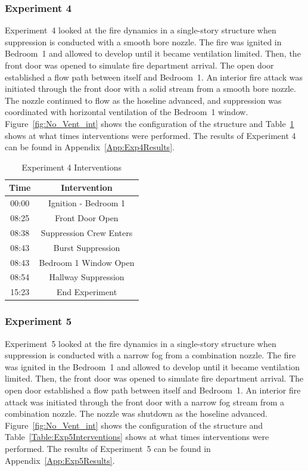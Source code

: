 \documentclass[12pt,oneside]{book}
\begin{document}
\FloatBarrier

\subsubsection{Experiment 4}
Experiment~4 looked at the fire dynamics in a single-story structure when suppression is conducted with a smooth bore nozzle. The fire was ignited in Bedroom~1 and allowed to develop until it became ventilation limited. Then, the front door was opened to simulate fire department arrival. The open door established a flow path between itself and Bedroom~1. An interior fire attack was initiated through the front door with a solid stream from a smooth bore nozzle. The nozzle continued to flow as the hoseline advanced, and suppression was coordinated with horizontal ventilation of the Bedroom~1 window. Figure~\ref{fig:No_Vent_int} shows the configuration of the structure and Table~\ref{Table:Exp4Interventions} shows at what times interventions were performed. The results of Experiment 4 can be found in Appendix~\ref{App:Exp4Results}. 


\begin{table}[!ht]
	\centering
	\caption{Experiment 4 Interventions}
	\begin{tabular}{|c|c|} 
		\hline
		Time & Intervention \\ \hline \hline
		00:00 & Ignition - Bedroom 1 \\ \hline
		08:25 & Front Door Open \\ \hline
		08:38 & Suppression Crew Enters\\ \hline
		08:43 & Burst Suppression \\ \hline
		08:43 & Bedroom 1 Window Open \\ \hline 
		08:54 & Hallway Suppression \\ \hline
		15:23 & End Experiment\\ \hline
	\end{tabular}
	\label{Table:Exp4Interventions}
\end{table}

\FloatBarrier

\subsubsection{Experiment 5}
Experiment~5 looked at the fire dynamics in a single-story structure when suppression is conducted with a narrow fog from a combination nozzle. The fire was ignited in the Bedroom~1 and allowed to develop until it became ventilation limited. Then, the front door was opened to simulate fire department arrival. The open door established a flow path between itself and Bedroom~1. An interior fire attack was initiated through the front door with a narrow fog stream from a combination nozzle. The nozzle was shutdown as the hoseline advanced. Figure~\ref{fig:No_Vent_int} shows the configuration of the structure and Table~\ref{Table:Exp5Interventions} shows at what times interventions were performed. The results of Experiment~5 can be found in Appendix~\ref{App:Exp5Results}. 
\end{document}
